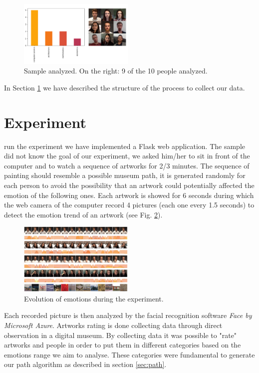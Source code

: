 \documentclass[journal, a4paper]{IEEEtran}
\begin{document}
\begin{figure}[h]
    \centering
    \includegraphics[width=0.49\textwidth]{samplesample.png}
    \caption{Sample analyzed. On the right: 9 of the 10 people analyzed.}
    \label{fig:sample}
\end{figure}


In Section \ref{sec:experiment} we have described the structure of the process to collect our data.

\section{Experiment} \label{sec:experiment}
 run the experiment we have implemented a Flask web application. The sample did not know the goal of our experiment, we asked him/her to sit in front of the computer and to watch a sequence of artworks for 2/3 minutes. The sequence of painting should resemble a possible museum path, it is generated randomly for each person to avoid the possibility that an artwork could potentially affected the emotion of the following ones. Each artwork is showed for 6 seconds during which the web camera of the computer record 4 pictures (each one every 1.5 seconds) to detect the emotion trend of an artwork (see Fig. \ref{fig:time}). 
\begin{figure}[h]
    \centering
    \includegraphics[width=0.49\textwidth]{timeemotion.png}
    \caption{Evolution of emotions during the experiment.}
    \label{fig:time}
\end{figure}
Each recorded picture is then analyzed by the facial recognition software \textit{Face by Microsoft Azure}. Artworks rating is done collecting data through direct observation in a digital museum. By collecting data it was possible to "rate" artworks and people in order to put them in different categories based on the emotions range we aim to analyse. These categories were fundamental to generate our path algorithm as described in section \ref{sec:path}.
\end{document}
